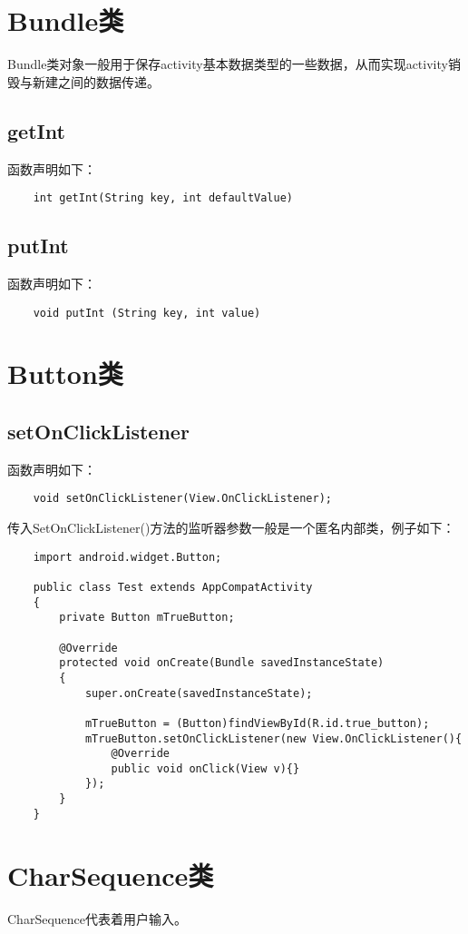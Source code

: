 \documentclass[a4paper,left=2.5cm,right=2.5cm,11pt]{article}
\begin{document}
\section{Bundle类}
	Bundle类对象一般用于保存activity基本数据类型的一些数据，从而实现activity销毁与新建之间的数据传递。

\subsection{getInt}
	函数声明如下：
	\begin{lstlisting}
	int getInt(String key, int defaultValue)
	\end{lstlisting}

\subsection{putInt}
	函数声明如下：
	\begin{lstlisting}
	void putInt (String key, int value)
	\end{lstlisting}

\section{Button类}
\subsection{setOnClickListener}
	函数声明如下：
	\begin{lstlisting}
	void setOnClickListener(View.OnClickListener);
	\end{lstlisting}

	传入SetOnClickListener()方法的监听器参数一般是一个匿名内部类，例子如下：
	\begin{lstlisting}
	import android.widget.Button;

	public class Test extends AppCompatActivity
	{
		private Button mTrueButton;

		@Override
		protected void onCreate(Bundle savedInstanceState)
		{
			super.onCreate(savedInstanceState);

			mTrueButton = (Button)findViewById(R.id.true_button);
			mTrueButton.setOnClickListener(new View.OnClickListener(){
				@Override
				public void onClick(View v){}
			});
		}
	}
	\end{lstlisting}

\section{CharSequence类}
	CharSequence代表着用户输入。
\end{document}
